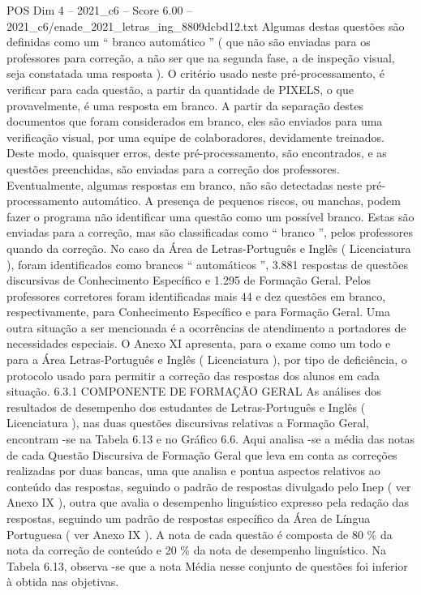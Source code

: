 \begin{textsample}{POS Dim 4 – 2021\_c6 – Score 6.00 – 2021\_c6/enade\_2021\_letras\_ing\_8809dcbd12.txt}
Algumas destas questões são definidas como um “ branco automático ” ( que não são enviadas para os professores para correção, a não ser que na segunda fase, a de inspeção visual, seja constatada uma resposta ).
O critério usado neste pré-processamento, é verificar para cada questão, a partir da quantidade de PIXELS, o que provavelmente, é uma resposta em branco.
A partir da separação destes documentos que foram considerados em branco, eles são enviados para uma verificação visual, por uma equipe de colaboradores, devidamente treinados.
Deste modo, quaisquer erros, deste pré-processamento, são encontrados, e as questões preenchidas, são enviadas para a correção dos professores.
Eventualmente, algumas respostas em branco, não são detectadas neste pré-processamento automático.
A presença de pequenos riscos, ou manchas, podem fazer o programa não identificar uma questão como um possível branco.
Estas são enviadas para a correção, mas são classificadas como “ branco ”, pelos professores quando da correção.
No caso da Área de Letras-Português e Inglês ( Licenciatura ), foram identificados como brancos “ automáticos ”, 3.881 respostas de questões discursivas de Conhecimento Específico e 1.295 de Formação Geral.
Pelos professores corretores foram identificadas mais 44 e dez questões em branco, respectivamente, para Conhecimento Específico e para Formação Geral.
Uma outra situação a ser mencionada é a ocorrências de atendimento a portadores de necessidades especiais.
O Anexo XI apresenta, para o exame como um todo e para a Área Letras-Português e Inglês ( Licenciatura ), por tipo de deficiência, o protocolo usado para permitir a correção das respostas dos alunos em cada situação. 6.3.1 COMPONENTE DE FORMAÇÃO GERAL As análises dos resultados de desempenho dos estudantes de Letras-Português e Inglês ( Licenciatura ), nas duas questões discursivas relativas a Formação Geral, encontram -se na Tabela 6.13 e no Gráfico 6.6.
Aqui analisa -se a média das notas de cada Questão Discursiva de Formação Geral que leva em conta as correções realizadas por duas bancas, uma que analisa e pontua aspectos relativos ao conteúdo das respostas, seguindo o padrão de respostas divulgado pelo Inep ( ver Anexo IX ), outra que avalia o desempenho linguístico expresso pela redação das respostas, seguindo um padrão de respostas específico da Área de Língua Portuguesa ( ver Anexo IX ).
A nota de cada questão é composta de 80 \% da nota da correção de conteúdo e 20 \% da nota de desempenho linguístico.
Na Tabela 6.13, observa -se que a nota Média nesse conjunto de questões foi inferior à obtida nas objetivas.

\end{textsample}
